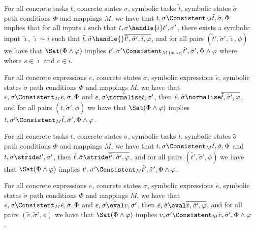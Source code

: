 \begin{lemma}
  \label{lem:completeHandle}
  For all concrete tasks $t$, concrete states $\sigma$, symbolic tasks $\tilde{t}$, symbolic states $\tilde{\sigma}$ path conditions $\Phi$ and mappings $M$,
  we have that $t,\sigma\Consistent_{M}\tilde{t},\tilde{\sigma},\Phi$ implies
  that for all inputs $i$ such that $t,\sigma\handle{i}t',\sigma'$,
  there exists a symbolic input $\tilde{\imath}$, $\tilde{\imath}\sim i$ such that
  $\tilde{t},\tilde{\sigma}\handle{}\overline{\tilde{t}',\tilde{\sigma}',\tilde{\imath},\phi}$,
  and for all pairs $(\tilde{t}',\tilde{\sigma}',\tilde{\imath},\phi)$ we have that $\Sat(\Phi\land\phi)$ implies $t',\sigma'\Consistent_{M.[s\mapsto c]}\tilde{t}',\tilde{\sigma}',\Phi\land\phi$ where where $s\in\tilde{\imath}$ and $c\in i$.
\end{lemma}

\begin{lemma}
  \label{lem:completeNormalise}
  For all concrete expressions $e$, concrete states $\sigma$, symbolic expressions $\tilde{e}$, symbolic states $\tilde{\sigma}$ path conditions $\Phi$ and mappings $M$,
  we have that $e,\sigma\Consistent_{M}\tilde{e},\tilde{\sigma},\Phi$
  and $e,\sigma\hat{\normalise} t,\sigma'$,
  then $\tilde{e},\tilde{\sigma}\normalise\overline{\tilde{t},\tilde{\sigma}',\phi}$,
  and for all pairs $(\tilde{t},\tilde{\sigma}',\phi)$ we have that $\Sat(\Phi\land\phi)$ implies $t,\sigma'\Consistent_{M}\tilde{t},\tilde{\sigma}',\Phi\land\phi$.
\end{lemma}

\begin{lemma}
  \label{lem:completeStride}
  For all concrete tasks $t$, concrete states $\sigma$, symbolic tasks $\tilde{t}$, symbolic states $\tilde{\sigma}$ path conditions $\Phi$ and mappings $M$,
  we have that $t,\sigma\Consistent_{M}\tilde{t},\tilde{\sigma},\Phi$
  and $t,\sigma\hat{\stride} t',\sigma'$,
  then $\tilde{t},\tilde{\sigma}\stride\overline{\tilde{t'},\tilde{\sigma}',\phi}$,
  and for all pairs $(\tilde{t'},\tilde{\sigma}',\phi)$ we have that $\Sat(\Phi\land\phi)$ implies $t',\sigma'\Consistent_{M}\tilde{t'},\tilde{\sigma}',\Phi\land\phi$.
\end{lemma}

\begin{lemma}
  \label{lem:completeEval}
  For all concrete expressions $e$, concrete states $\sigma$, symbolic expressions $\tilde{e}$, symbolic states $\tilde{\sigma}$ path conditions $\Phi$ and mappings $M$,
  we have that $e,\sigma\Consistent_{M}\tilde{e},\tilde{\sigma},\Phi$
  and $e,\sigma\hat{\eval} v,\sigma'$,
  then $\tilde{e},\tilde{\sigma}\eval\overline{\tilde{v},\tilde{\sigma}',\phi}$,
  and for all pairs $(\tilde{v},\tilde{\sigma}',\phi)$ we have that $\Sat(\Phi\land\phi)$ implies $v,\sigma'\Consistent_{M}\tilde{v},\tilde{\sigma}',\Phi\land\phi$.
\end{lemma}

